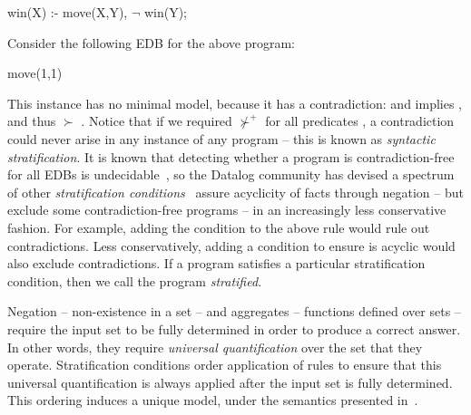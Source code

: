 \begin{Dedalus}
win(X) :- move(X,Y), \(\lnot\) win(Y);
\end{Dedalus}

\noindent{}Consider the following EDB for the above program:

\begin{Dedalus}
move(1,1)
\end{Dedalus}

This instance has no minimal model, because it has a contradiction:
 and  implies ,
and thus  $\succ$ .  Notice that if
we required  $\not\succ^+$  for all predicates
, a contradiction could never arise in any instance of any program
-- this is known as {\em syntactic stratification}.  It is known that detecting
whether a program is contradiction-free for all EDBs is
undecidable~\cite{papa-yanna}, so the Datalog community has devised a spectrum
of other {\em stratification conditions}~\cite{local-strat, ross-syntactic,
modular, weak-strat} assure acyclicity of facts through negation -- but exclude
some contradiction-free programs -- in an increasingly less conservative
fashion. For example, adding the condition  to the above rule
would rule out contradictions.  Less conservatively, adding a condition to
ensure  is acyclic would also exclude contradictions.  If a
program satisfies a particular stratification condition, then we call the
program {\em stratified}.

Negation -- non-existence in a set -- and aggregates -- functions defined over
sets -- require the input set to be fully determined in order to produce a
correct answer.  In other words, they require {\em universal quantification}
over the set that they operate.  Stratification conditions order application of
rules to ensure that this universal quantification is always applied after the
input set is fully determined.  This ordering induces a unique model, under
the semantics presented in~\cite{wellfounded}.

